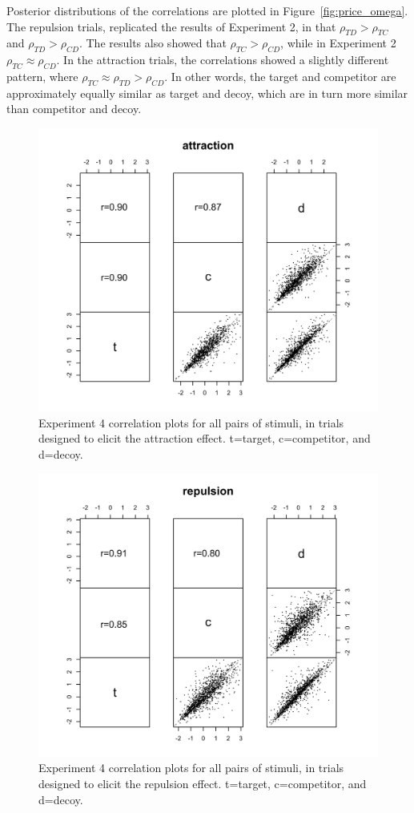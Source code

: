 Posterior distributions of the correlations are plotted in Figure~\ref{fig:price_omega}. The repulsion trials, replicated the results of Experiment 2, in that $\rho_{TD}>\rho_{TC}$ and $\rho_{TD}>\rho_{CD}$. The results also showed that $\rho_{TC}>\rho_{CD}$, while in Experiment 2 $\rho_{TC}\approx\rho_{CD}$. In the attraction trials, the correlations showed a slightly different pattern, where $\rho_{TC}\approx\rho_{TD}>\rho_{CD}$. In other words, the target and competitor are approximately equally similar as target and decoy, which are in turn more similar than competitor and decoy. 

\begin{figure}
    \includegraphics[scale=.5,width=120mm]{figures/price_z_corplot_attraction.jpeg}
    \caption{Experiment 4 correlation plots for all pairs of stimuli, in trials designed to elicit the attraction effect. t=target, c=competitor, and d=decoy.}
    \label{fig:price_z_corplot_attraction}
\end{figure}

\begin{figure}
    \includegraphics[scale=.5,width=120mm]{figures/price_z_corplot_repulsion.jpeg}
    \caption{Experiment 4 correlation plots for all pairs of stimuli, in trials designed to elicit the repulsion effect. t=target, c=competitor, and d=decoy.}
    \label{fig:price_z_corplot_repulsion}
\end{figure}

